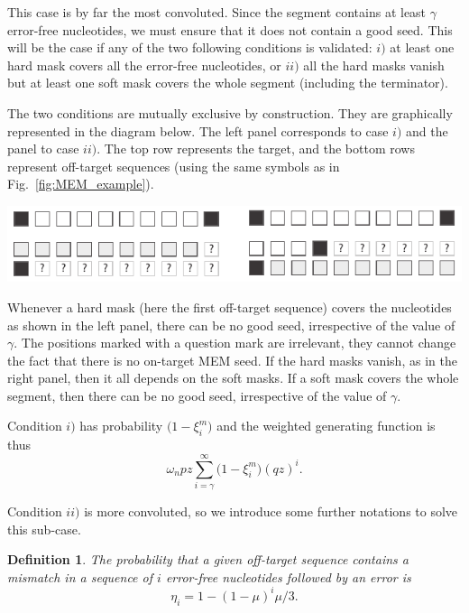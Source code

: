 \documentclass{article}
\newtheorem{definition}{Definition}
\newenvironment{inset}
{\vspace{0.5\baselineskip}\begin{center}}
{\end{center}\vspace{0.5\baselineskip}}
\begin{document}
This case is by far the most convoluted. Since the segment contains at
least $\gamma$ error-free nucleotides, we must ensure that it does not
contain a good seed. This will be the case if any of the two following
conditions is validated: $i)$ at least one hard mask covers all the
error-free nucleotides, or $ii)$ all the hard masks vanish but at least
one soft mask covers the whole segment (including the terminator).

The two conditions are mutually exclusive by construction. They are
graphically represented in the diagram below. The left panel corresponds
to case $i)$ and the panel to case $ii)$. The top row represents the
target, and the bottom rows represent off-target sequences (using the same
symbols as in Fig.~\ref{fig:MEM_example}).
\begin{inset}
\includegraphics{masks.pdf}
\end{inset}

Whenever a hard mask (here the first off-target sequence) covers the
nucleotides as shown in the left panel, there can be no good seed,
irrespective of the value of $\gamma$. The positions marked with a
question mark are irrelevant, they cannot change the fact that there is no
on-target MEM seed. If the hard masks vanish, as in the right panel, then
it all depends on the soft masks. If a soft mask covers the whole segment,
then there can be no good seed, irrespective of the value of $\gamma$.

Condition $i)$ has probability $\big(1 - \xi_i^m \big)$ and the
weighted generating function is thus
\begin{equation*}
\omega_n pz \sum_{i=\gamma}^\infty \Big(1 - \xi_i^m \Big) (qz)^i.
\end{equation*}

Condition $ii)$ is more convoluted, so we introduce some further
notations to solve this sub-case.
\begin{definition}
The probability that a given off-target sequence contains a mismatch in a
sequence of $i$ error-free nucleotides followed by an error is
\begin{equation}
\label{eq:eta}
\eta_i = 1-(1-\mu)^i\mu/3.
\end{equation}
\end{definition}
\end{document}
